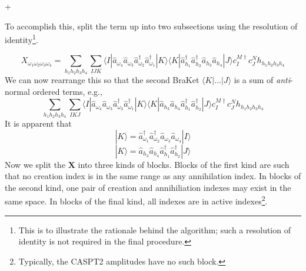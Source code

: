 +\documentclass[12pt]{article}
\begin{document}
\noindent To accomplish this, split the term up into two
subsections using the resolution of identity\footnote{This is to illustrate the
rationale behind the algorithm; such a resolution of identity is not required
in the final procedure.}.

\begin{equation}
X_{\omega_{1}\omega_{2}\omega_{3}\omega_{4}}
= 
\sum_{ h_{1}h_{2}h_{3}h_{4}} 
\sum_{IJK}
\langle I |
\hat{a}_{\omega_{4}} \hat{a}_{\omega_{3}}\hat{a}^{\dagger}_{\omega_{2}}\hat{a}^{\dagger}_{\omega_{1}}
| K \rangle \langle K | 
\hat{a}^{\dagger}_{h_{1}} \hat{a}^{\dagger}_{h_{2}}\hat{a}_{h_{3}}\hat{a}_{h_{4}}| J \rangle  
c^{M \dagger}_{I}c^{N}_{J} h_{h_{1}h_{2}h_{3}h_{4}}
\label{eqn:X_RI_H_example}
\end{equation}
\noindent We can now rearrange this so that the second BraKet $\langle K | ... | J \rangle$ is a sum of \emph{anti}-normal ordered terms, e.g.,
\begin{equation}
\sum_{ h_{1}h_{2}h_{3}h_{4}} 
\sum_{IKJ}
\langle I |
\hat{a}_{\omega_{4}} \hat{a}_{\omega_{3}}\hat{a}^{\dagger}_{\omega_{2}}\hat{a}^{\dagger}_{\omega_{1}}
| K \rangle \langle K | 
\hat{a}_{h_{3}}\hat{a}_{h_{4}}\hat{a}^{\dagger}_{h_{1}} \hat{a}^{\dagger}_{h_{2}}| J \rangle  
c^{M \dagger}_{I}c^{N}_{J} h_{h_{1}h_{2}h_{3}h_{4}}
\label{eqn:X_RI_H_anti_normal1}
\end{equation}
It is apparent that 
\begin{equation}
|K\rangle = \hat{a}_{\omega_{1}}^{\dagger} \hat{a}_{\omega_{2}}^{\dagger}\hat{a}_{\omega_{3}}\hat{a}_{\omega_{4}} |I \rangle
\label{eqn:KI}
\end{equation}
\begin{equation}
|K\rangle =\hat{a}_{h_{3}}\hat{a}_{h_{4}}\hat{a}^{\dagger}_{h_{1}} \hat{a}^{\dagger}_{h_{2}}|J \rangle
\label{eqn:KJ}
\end{equation}
\noindent Now we split the $\mathbf{X}$ into three kinds of blocks. Blocks of
the first kind are such that no creation index is in the same range as any
annihilation index. In blocks of the second kind, one pair of creation and
annihiliation indexes may exist in the same space.  In blocks of the final
kind, all indexes are in active indexes\footnote{Typically, the CASPT2
amplitudes have no such block.}. \\
 
\end{document}
